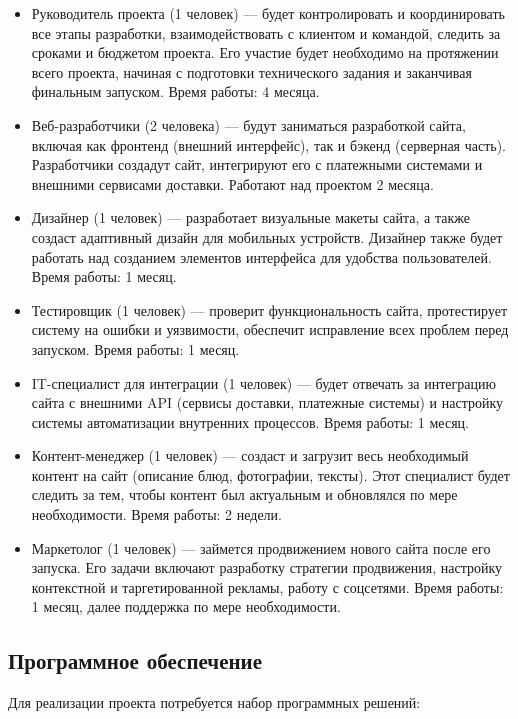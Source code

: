 \begin{itemize}
	\item Руководитель проекта (1 человек) --- будет контролировать
		и координировать все этапы разработки,
		взаимодействовать с клиентом и командой,
		следить за сроками и бюджетом проекта.
		Его участие будет необходимо на протяжении всего проекта,
		начиная с подготовки технического задания
		и заканчивая финальным запуском. Время работы: 4 месяца.
	\item Веб-разработчики (2 человека) --- будут заниматься разработкой сайта,
		включая как фронтенд (внешний интерфейс),
		так и бэкенд (серверная часть).
		Разработчики создадут сайт, интегрируют его с платежными системами
		и внешними сервисами доставки. Работают над проектом 2 месяца.
	\item Дизайнер (1 человек) --- разработает визуальные макеты сайта,
		а также создаст адаптивный дизайн для мобильных устройств.
		Дизайнер также будет работать над созданием элементов интерфейса
		для удобства пользователей. Время работы: 1 месяц.
	\item Тестировщик (1 человек) --- проверит функциональность сайта,
		протестирует систему на ошибки и уязвимости,
		обеспечит исправление всех проблем перед запуском.
		Время работы: 1 месяц.
	\item IT-специалист для интеграции (1 человек) --- будет отвечать
		за интеграцию сайта с внешними API
		(сервисы доставки, платежные системы)
		и настройку системы автоматизации внутренних процессов.
		Время работы: 1 месяц.
	\item Контент-менеджер (1 человек) --- создаст
		и загрузит весь необходимый контент на сайт
		(описание блюд, фотографии, тексты).
		Этот специалист будет следить за тем,
		чтобы контент был актуальным и обновлялся по мере необходимости.
		Время работы: 2 недели.
	\item Маркетолог (1 человек) --- займется продвижением
		нового сайта после его запуска.
		Его задачи включают разработку стратегии продвижения,
		настройку контекстной и таргетированной рекламы, работу с соцсетями.
		Время работы: 1 месяц, далее поддержка по мере необходимости.
\end{itemize}

\subsection{Программное обеспечение}

Для реализации проекта потребуется набор программных решений:


